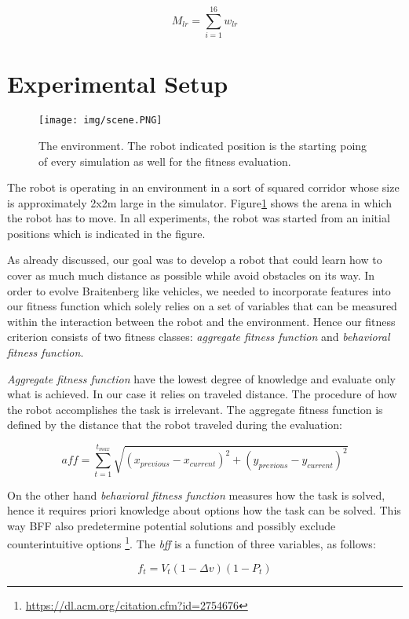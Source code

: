 \documentclass[format=acmsmall, review=false, screen=true]{acmart}
\begin{document}
\[ M_{lr} = \sum_{i=1}^{16} w_{lr} \]



\section{Experimental Setup}

\begin{figure}[H]
  \texttt{[image: img/scene.PNG]}
  \caption{The environment. The robot indicated position is the starting poing of every simulation as well for the fitness evaluation.}
  \label{fig:arena-scene}
\end{figure}

The robot is operating in an environment in a sort of squared corridor whose size is approximately 2x2m large in the simulator. Figure\ref{fig:arena-scene} shows the arena in which the robot has to move. In all experiments, the robot was started from an initial positions which is indicated in the figure.

As already discussed, our goal was to develop a robot that could learn how to cover as much much distance as possible while avoid obstacles on its way. In order to evolve Braitenberg like vehicles, we needed to incorporate features into our fitness function which solely relies on a set of variables that can be measured within the interaction between the robot and the environment. Hence our fitness criterion consists of two fitness classes: \emph{aggregate fitness function} and \emph{behavioral fitness function}.

\emph{Aggregate fitness function} have the lowest degree of knowledge and evaluate only what is achieved. In our case it relies on traveled distance. The procedure of how the robot accomplishes the task is irrelevant. The aggregate fitness function is defined by the distance that the robot traveled during the evaluation:

\[ aff = \sum_{t=1}^{t_{max}} \sqrt{(x_{previous} - x_{current})^2 + (y_{previous} - y_{current})^2} \]

On the other hand \emph{behavioral fitness function} measures how the task is solved, hence it requires priori knowledge about options how the task can be solved. This way BFF also predetermine potential solutions and possibly exclude counterintuitive options \footnote{\url{https://dl.acm.org/citation.cfm?id=2754676}}. The \emph{bff} is a function of three variables, as follows:


\[ f_{t} = V_{t} (1-\Delta v) (1 - P_{t}) \]
\end{document}
